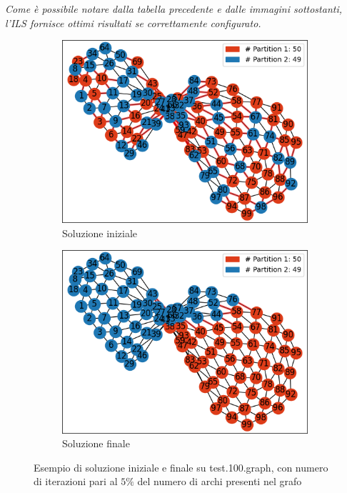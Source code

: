 \documentclass[12pt,titlepage,oneside]{article}
\begin{document}
\textit{Come è possibile notare dalla tabella precedente e dalle immagini sottostanti, l'ILS fornisce ottimi risultati se correttamente configurato.}
\begin{figure}
  \begin{center}
    \begin{subfigure}[b]{0.5\textwidth}
        \includegraphics[scale=0.65, center]{Test100_Original_Partitions.png}
        \caption{Soluzione iniziale}
        \label{fig:test100_original}
    \end{subfigure}
    \begin{subfigure}[b]{0.5\textwidth}
        \includegraphics[scale=0.65, center]{Test100_Final_ILS_Partitions.png}
        \caption{Soluzione finale}
        \label{fig:test100_final}
    \end{subfigure}
      \caption{Esempio di soluzione iniziale e finale su test.100.graph, con numero di iterazioni pari al $5\%$ del numero di archi presenti nel grafo}
      \label{fig:three graphs}
  \end{center}
\end{figure}
\end{document}
